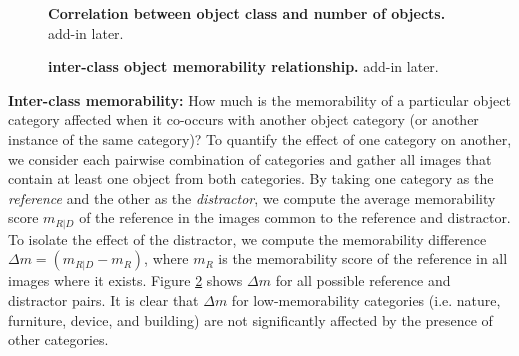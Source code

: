 \begin{figure}[t]
\centering
{}
\vspace{-5mm}\caption{\footnotesize\textbf{Correlation between object class and number of objects.} add-in later. }\label{fig:obLabelChange}
\end{figure}

\begin{figure}[b]
\centering
{}
\vspace{-5mm}\caption{\footnotesize\textbf{inter-class object memorability relationship.} add-in later. }\label{fig:obLabelPair}
\end{figure}

\noindent\textbf{Inter-class memorability:} How much is the memorability of a particular object category affected when it co-occurs with another object category (or another instance of the same category)? To quantify the effect of one category on another, we consider each pairwise combination of categories and gather all images that contain at least one object from both categories. By taking one category as the \emph{reference} and the other as the \emph{distractor}, we compute the average memorability score $m_{R|D}$ of the reference in the  images common to the reference and distractor. To isolate the effect of the distractor, we compute the memorability difference $\Delta m=(m_{R|D}-m_R)$, where $m_R$ is the memorability score of the reference in all images where it exists. Figure \ref{fig:obLabelPair} shows $\Delta m$ for all possible reference and distractor pairs. It is clear that  $\Delta m$ for low-memorability categories (i.e. nature, furniture, device, and building) are not significantly affected by the presence of other categories. %


